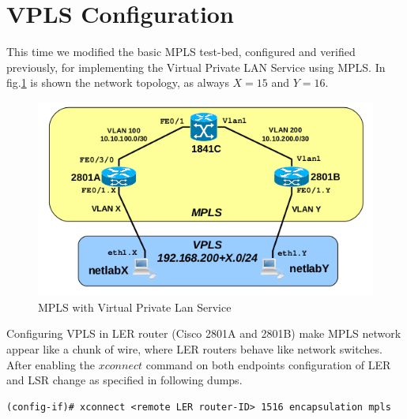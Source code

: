 \documentclass{llncs}
\newcommand{\labelsec}[1]{\label{sec:#1}}
\begin{document}
\newpage
\section{VPLS Configuration}
\labelsec{VPLS_config}

This time we modified the basic MPLS test-bed, configured and verified previously, for implementing the Virtual Private LAN Service using MPLS. In fig.\ref{fig:mpls2_topology} is shown the network topology, as always $X=15$ and $Y=16$. 

\begin{figure}
\centering
\includegraphics[width=1.0\textwidth]{../e4/topology.png}
\caption{MPLS with Virtual Private Lan Service}
\label{fig:mpls2_topology}
\end{figure}

Configuring VPLS in LER router (Cisco 2801A and 2801B) make MPLS network appear like a chunk of wire, where LER routers behave like network switches.\\
After enabling the $xconnect$ command on both endpoints configuration of LER and LSR change as specified in following dumps.
\begin{verbatim}
(config-if)# xconnect <remote LER router-ID> 1516 encapsulation mpls
\end{verbatim}
\end{document}
